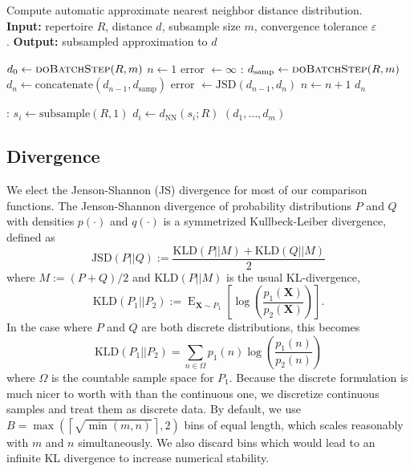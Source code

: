 \documentclass{article}
\begin{document}
\begin{algorithm}
    \caption{Compute automatic approximate nearest neighbor distance distribution.\\
        \textbf{Input:} repertoire $R$, distance $d$, subsample size $m$, convergence tolerance $\varepsilon$\\.
        \textbf{Output:} subsampled approximation to $d$}
    \label{NNDistributionAveraging}
    \begin{algorithmic}
        \State $d_0 \gets \Call{doBatchStep}{R, m}$
        \State $n \gets 1$
        \State error $\gets \infty$
        :
        	\State $d_\text{samp} \gets \Call{doBatchStep}{R, m}$
        	\State $d_n \gets \text{concatenate}(d_{n-1}, d_\text{samp})$
        	\State error $\gets \text{JSD}(d_{n-1}, d_n)$
        	\State $n \gets n + 1$
        \EndWhile
            \Return $d_n$
    \end{algorithmic}
    \begin{algorithmic}
    :
		\State $s_i \gets \text{subsample}(R, 1)$
        \State $d_i \gets d_\text{NN}(s_i; R)$
	\EndFor
	\Return $(d_1, \dotsc, d_m)$
	\EndFunction
    \end{algorithmic}
\end{algorithm}

\subsection*{Divergence}
We elect the Jenson-Shannon (JS) divergence for most of our comparison functions.
The Jenson-Shannon divergence of probability distributions $P$ and $Q$ with densities $p(\cdot)$ and $q(\cdot)$ is a symmetrized Kullbeck-Leiber divergence, defined as
\begin{equation}
\text{JSD}\left(P || Q\right) := \frac{\text{KLD}\left(P || M\right) + \text{KLD}\left(Q || M\right)}{2}
\end{equation}
where $M := (P + Q)/2$ and $\text{KLD}(P || M)$ is the usual KL-divergence,
\begin{equation}
\text{KLD}\left(P_1 || P_2\right) := \operatorname{E}_{\mathbf X \sim P_1}\left[ \log\left(\frac{p_1(\mathbf X)}{p_2(\mathbf X)}\right) \right].
\end{equation}
In the case where $P$ and $Q$ are both discrete distributions, this becomes
\begin{equation}
\text{KLD}\left(P_1 || P_2\right) = \sum_{n \in \Omega} p_1(n) \log\left( \frac{p_1(n)}{p_2(n)} \right)
\end{equation}
where $\Omega$ is the countable sample space for $P_1$.
Because the discrete formulation is much nicer to worth with than the continuous one, we discretize continuous samples and treat them as discrete data.
By default, we use $B = \max\left(\left\lceil \sqrt{\min(m, n)} \right \rceil, 2\right)$ bins of equal length, which scales reasonably with $m$ and $n$ simultaneously.
We also discard bins which would lead to an infinite KL divergence to increase numerical stability.
\end{document}
